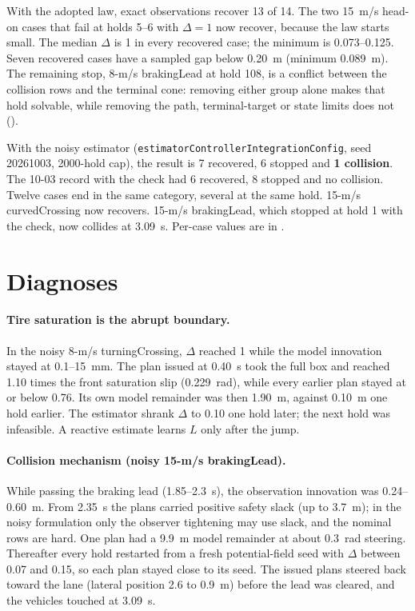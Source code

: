 \documentclass[11pt]{article}
\begin{document}
With the adopted law, exact observations recover 13 of 14. The two 15~m/s
head-on cases that fail at holds 5--6 with $\Delta=1$ now recover, because the
law starts small. The median $\Delta$ is 1 in every recovered case; the
minimum is 0.073--0.125. Seven recovered cases have a sampled gap below 0.20~m
(minimum 0.089~m). The remaining stop, 8-m/s brakingLead at hold 108, is a
conflict between the collision rows and the terminal cone: removing either
group alone makes that hold solvable, while removing the path, terminal-target
or state limits does not ().

With the noisy estimator (\texttt{estimatorControllerIntegrationConfig}, seed
20261003, 2000-hold cap), the result is 7 recovered, 6 stopped and
\textbf{1 collision}. The 10-03 record with the check had 6 recovered, 8
stopped and no collision. Twelve cases end in the same category, several at the same hold.
15-m/s curvedCrossing now recovers. 15-m/s brakingLead, which stopped at hold
1 with the check, now collides at 3.09~s. Per-case values are in
.

\section{Diagnoses}
\paragraph{Tire saturation is the abrupt boundary.}
In the noisy 8-m/s turningCrossing, $\Delta$ reached 1 while the model
innovation stayed at 0.1--15~mm. The plan issued at 0.40~s took the full box
and reached 1.10 times the front saturation slip (0.229~rad), while every earlier plan
stayed at or below 0.76. Its own model remainder was then 1.90~m, against 0.10~m one hold
earlier. The estimator shrank $\Delta$ to 0.10 one hold later; the next hold
was infeasible. A reactive estimate learns $L$ only after the jump.

\paragraph{Collision mechanism (noisy 15-m/s brakingLead).}
While passing the braking lead (1.85--2.3~s), the observation innovation was
0.24--0.60~m. From 2.35~s the plans carried positive safety slack (up to 3.7~m);
in the noisy formulation only the observer tightening may use slack, and the
nominal rows are hard. One plan had a 9.9~m model remainder at about
0.3~rad steering. Thereafter every hold restarted from a fresh potential-field
seed with $\Delta$ between 0.07 and 0.15, so each plan stayed close to its
seed. The issued plans steered back toward the lane (lateral position 2.6 to
0.9~m) before the lead was cleared, and the vehicles touched at 3.09~s.
\end{document}
